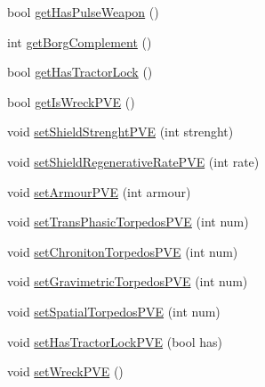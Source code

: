 \begin{DoxyCompactItemize}
\item 
bool \hyperlink{classBorgTactical_af5ccad2e38ebe5fded20b3a455bb88ce}{getHasPulseWeapon} ()
\item 
int \hyperlink{classBorgTactical_a71200942186755926d8314658eb06ad5}{getBorgComplement} ()
\item 
bool \hyperlink{classBorgTactical_aa9757380ba5e1f4968fd7a817c464bae}{getHasTractorLock} ()
\item 
bool \hyperlink{classBorgTactical_af53bed854ce027b8e657fa58f8cbda9a}{getIsWreckPVE} ()
\item 
void \hyperlink{classBorgTactical_a193a199b54952f5bdae9d567402a35ba}{setShieldStrenghtPVE} (int strenght)
\item 
void \hyperlink{classBorgTactical_a65e3232f49c6f8c3e318c4e3626f926c}{setShieldRegenerativeRatePVE} (int rate)
\item 
void \hyperlink{classBorgTactical_a1981835f6fd3b9f4cd8b98de13db73fd}{setArmourPVE} (int armour)
\item 
void \hyperlink{classBorgTactical_a4167123bef0b0fa986c180592cb6d729}{setTransPhasicTorpedosPVE} (int num)
\item 
void \hyperlink{classBorgTactical_ad96d089c1faa7171175621aaa2861dfa}{setChronitonTorpedosPVE} (int num)
\item 
void \hyperlink{classBorgTactical_ac2c1e7ad4fc13eb3ea9c47adf9532092}{setGravimetricTorpedosPVE} (int num)
\item 
void \hyperlink{classBorgTactical_a9266ebc1f9df7c6e970537928d2211db}{setSpatialTorpedosPVE} (int num)
\item 
void \hyperlink{classBorgTactical_a57b590444887110e9f09915413a62aaf}{setHasTractorLockPVE} (bool has)
\item 
void \hyperlink{classBorgTactical_a46369732b46f077b30b9c5616755e747}{setWreckPVE} ()
\end{DoxyCompactItemize}


